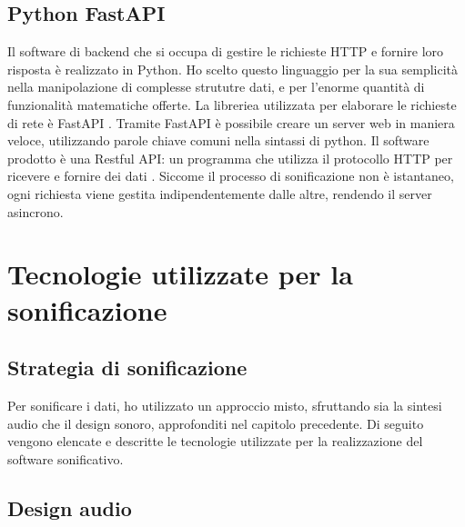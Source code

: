 \subsection{Python FastAPI}
Il software di backend che si occupa di gestire le richieste HTTP e fornire loro risposta è realizzato in Python.
Ho scelto questo linguaggio per la sua semplicità nella manipolazione di complesse strututre dati, e per l'enorme quantità di funzionalità matematiche offerte.
La libreriea utilizzata per elaborare le richieste di rete è FastAPI \cite{fastapi}.
Tramite FastAPI è possibile creare un server web in maniera veloce, utilizzando parole chiave comuni nella sintassi di python.
Il software prodotto è una Restful API: un programma che utilizza il protocollo HTTP per ricevere e fornire dei dati \cite{api}.
Siccome il processo di sonificazione non è istantaneo, ogni richiesta viene gestita indipendentemente dalle altre, rendendo il server asincrono.




\section{Tecnologie utilizzate per la sonificazione}

\subsection{Strategia di sonificazione}
Per sonificare i dati, ho utilizzato un approccio misto, sfruttando sia la sintesi audio che il design sonoro, approfonditi nel capitolo precedente.
Di seguito vengono elencate e descritte le tecnologie utilizzate per la realizzazione del software sonificativo.

\subsection{Design audio}
